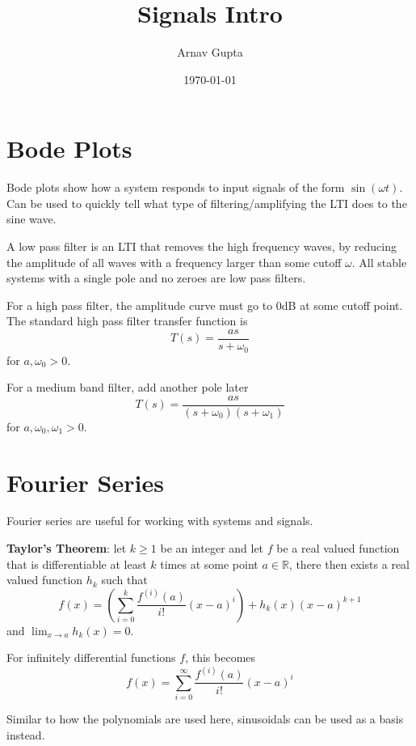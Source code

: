 \documentclass[11pt]{article}
\author{Arnav Gupta}
\date{\today}
\title{Signals Intro}
\begin{document}
\maketitle
\tableofcontents

\section{Bode Plots}
\label{sec:orge6d95e7}
Bode plots show how a system responds to input signals of the form \(\sin(\omega t)\).
Can be used to quickly tell what type of filtering/amplifying the LTI does to the sine
wave.

A low pass filter is an LTI that removes the high frequency waves, by reducing the
amplitude of all waves with a frequency larger than some cutoff \(\omega\).
All stable systems with a single pole and no zeroes are low pass filters.

For a high pass filter, the amplitude curve must go to 0dB at some cutoff point.
The standard high pass filter transfer function is
$$
T(s) = \frac{as}{s + \omega_{0}}
$$
for \(a, \omega_{0} > 0\).

For a medium band filter, add another pole later
$$
T(s) = \frac{as}{(s+\omega_{0})(s+\omega_{1})}
$$
for \(a, \omega_{0}, \omega_{1} > 0\).
\section{Fourier Series}
\label{sec:org7454600}
Fourier series are useful for working with systems and signals.

\textbf{Taylor's Theorem}: let \(k \ge 1\) be an integer and let \(f\) be a real valued function
that is differentiable at least \(k\) times at some point \(a \in \mathbb{R}\), there then
exists a real valued function \(h_{k}\) such that
$$
f(x) = \left( \sum_{i=0}^{k} \frac{f^{(i)}(a)}{i!} (x-a)^{i} \right) + h_{k}(x) (x-a)^{k+1}
$$
and \(\lim_{x \to a} h_{k}(x) = 0\).

For infinitely differential functions \(f\), this becomes
$$
f(x) = \sum_{i=0}^{\infty} \frac{f^{(i)}(a)}{i!} (x-a)^{i}
$$

Similar to how the polynomials are used here, sinusoidals can be used as a basis instead.
\end{document}
